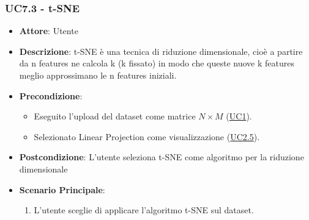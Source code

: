     \subsubsection{UC7.3 - t-SNE}
    \label{uc7.3}
    \begin{itemize}
    \item \textbf{Attore}: Utente
    \item \textbf{Descrizione}: t-SNE è una tecnica di riduzione dimensionale, cioè a partire da n features ne calcola k (k fissato) in modo che queste nuove k features meglio approssimano le n features iniziali.
    \item \textbf{Precondizione}: 
    \begin{itemize}
        \item Eseguito l'upload del dataset come matrice $N\times M$ (\hyperref[uc1]{UC1}).
        \item Selezionato Linear Projection come visualizzazione (\hyperref[uc2.5]{UC2.5}).
    \end{itemize}  
    \item \textbf{Postcondizione}: L'utente seleziona t-SNE come algoritmo per la riduzione dimensionale 
    \item \textbf{Scenario Principale}: 
    \begin{enumerate}
        \item L'utente sceglie di applicare l'algoritmo t-SNE sul dataset.
    \end{enumerate}
    \end{itemize}
    
    